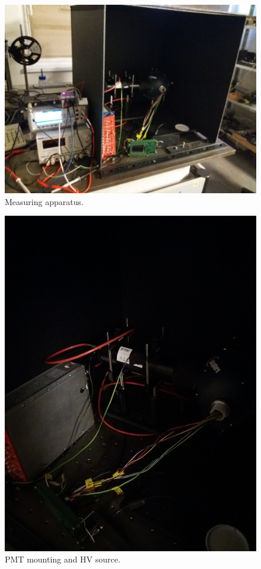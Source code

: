 \begin{figure}[H]
 \centering
 \includegraphics[width=150mm,angle=180,origin=c]{./pictures/aprature1}
 \caption{Measuring apparatus.}
 \label{aparature1}
\end{figure}

\begin{figure}[H]
 \centering
 \includegraphics[width=150mm,angle=270,origin=c]{./pictures/aparature2}
 \caption{PMT mounting and HV source.}
 \label{aparature2}
\end{figure}


